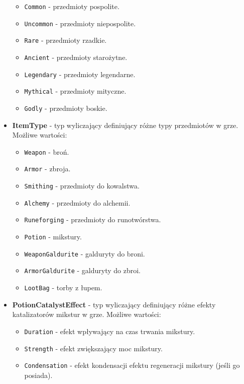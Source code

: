 \begin{itemize}
\begin{itemize}
                \item \texttt{Common} - przedmioty pospolite.
                \item \texttt{Uncommon} - przedmioty niepospolite.
                \item \texttt{Rare} - przedmioty rzadkie.
                \item \texttt{Ancient} - przedmioty starożytne.
                \item \texttt{Legendary} - przedmioty legendarne.
                \item \texttt{Mythical} - przedmioty mityczne.
                \item \texttt{Godly} - przedmioty boskie.
            \end{itemize}
        \item \textbf{ItemType} - typ wyliczający definiujący różne typy przedmiotów w grze. 
        Możliwe wartości:
            \begin{itemize}
                \item \texttt{Weapon} - broń.
                \item \texttt{Armor} - zbroja.
                \item \texttt{Smithing} - przedmioty do kowalstwa.
                \item \texttt{Alchemy} - przedmioty do alchemii.
                \item \texttt{Runeforging} - przedmioty do runotwórstwa.
                \item \texttt{Potion} - mikstury.
                \item \texttt{WeaponGaldurite} - galduryty do broni.
                \item \texttt{ArmorGaldurite} - galduryty do zbroi.
                \item \texttt{LootBag} - torby z łupem.
            \end{itemize}
        \item \textbf{PotionCatalystEffect} - typ wyliczający definiujący różne efekty katalizatorów mikstur w grze. 
        Możliwe wartości:
            \begin{itemize}
                \item \texttt{Duration} - efekt wpływający na czas trwania mikstury.
                \item \texttt{Strength} - efekt zwiększający moc mikstury.
                \item \texttt{Condensation} - efekt kondensacji efektu regeneracji mikstury (jeśli go posiada).

\end{itemize}
\end{itemize}
